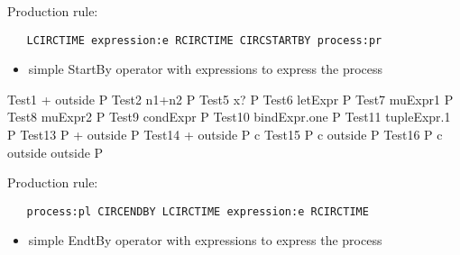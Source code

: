 \documentclass{article}
\begin{document}
\newpage

Production rule:
\begin{verbatim}
   LCIRCTIME expression:e RCIRCTIME CIRCSTARTBY process:pr
\end{verbatim}

\begin{itemize}
   \item simple StartBy operator with expressions to express the process 
\end{itemize}


\begin{circus}
   \circprocess Test1 \circdef {} + outside \rcirctime \circstartby P
   \also
   \circprocess Test2 \circdef \lcirctime n1+n2 \rcirctime \circstartby P 
   \also
   \circprocess Test5 \circdef \lcirctime x? \rcirctime \circstartby P
   \also
   \circprocess Test6 \circdef \lcirctime letExpr \rcirctime \circstartby P
   \also
   \circprocess Test7 \circdef \lcirctime muExpr1 \rcirctime \circstartby P
   \also
   \circprocess Test8 \circdef \lcirctime muExpr2 \rcirctime \circstartby P
   \also
   \circprocess Test9 \circdef \lcirctime condExpr \rcirctime \circstartby P
   \also
   \circprocess Test10 \circdef \lcirctime bindExpr.one \rcirctime \circstartby P
   \also
   \circprocess Test11 \circdef \lcirctime tupleExpr.1 \rcirctime \circstartby P
   \also
   \circprocess Test13 \circdef  P \circseq {} + outside \rcirctime \circstartby P
   \also
   \circprocess Test14 \circdef  {} + outside \rcirctime \circstartby P \circhide   
   \lchanset c \rchanset
   \also
   \circprocess Test15 \circdef  P \lpar \lchanset c \rchanset \rpar \lcirctime outside    
   \rcirctime \circstartby P
   \also
   \circprocess Test16 \circdef  P \lpar \lchanset c \rchanset \rpar \lcirctime outside    
   \rcirctime \circstartby \lcirctime outside \rcirctime \circstartby P
\end{circus}

Production rule:
\begin{verbatim}
   process:pl CIRCENDBY LCIRCTIME expression:e RCIRCTIME
\end{verbatim}

\begin{itemize}
   \item simple EndtBy operator with expressions to express the process 
\end{itemize}
\end{document}
